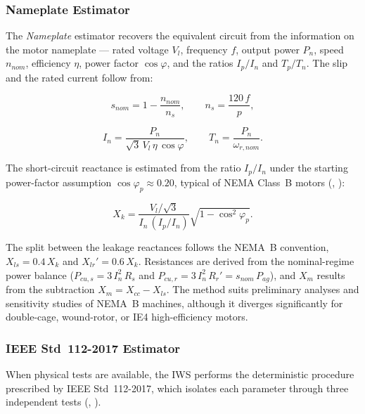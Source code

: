 \subsubsection{Nameplate Estimator}

The \textit{Nameplate} estimator recovers the equivalent circuit from the information on the motor nameplate — rated voltage $V_l$, frequency $f$, output power $P_n$, speed $n_{nom}$, efficiency $\eta$, power factor $\cos\varphi$, and the ratios $I_p/I_n$ and $T_p/T_n$. The slip and the rated current follow from:

\begin{equation}
\label{eq:nameplate_snom_en}
s_{nom} = 1 - \frac{n_{nom}}{n_s}, \qquad n_s = \frac{120\,f}{p},
\end{equation}

\begin{equation}
\label{eq:nameplate_in_en}
I_n = \frac{P_n}{\sqrt{3}\,V_l\,\eta\,\cos\varphi}, \qquad T_n = \frac{P_n}{\omega_{r,nom}}.
\end{equation}

The short-circuit reactance is estimated from the ratio $I_p/I_n$ under the starting power-factor assumption $\cos\varphi_p \approx 0.20$, typical of NEMA Class~B motors (\citeauthor{li2010simulation}, \citeyear{li2010simulation}):

\begin{equation}
\label{eq:nameplate_xk_en}
X_k = \frac{V_l/\sqrt{3}}{I_n\,(I_p/I_n)}\sqrt{1 - \cos^2\!\varphi_p}.
\end{equation}

The split between the leakage reactances follows the NEMA~B convention, $X_{ls} = 0.4\,X_k$ and $X_{lr}' = 0.6\,X_k$. Resistances are derived from the nominal-regime power balance ($P_{cu,s} = 3\,I_n^2\,R_s$ and $P_{cu,r} = 3\,I_n^2\,R_r' = s_{nom}\,P_{ag}$), and $X_m$ results from the subtraction $X_m = X_{cc} - X_{ls}$. The method suits preliminary analyses and sensitivity studies of NEMA~B machines, although it diverges significantly for double-cage, wound-rotor, or IE4 high-efficiency motors.

\subsubsection{IEEE Std~112-2017 Estimator}

When physical tests are available, the IWS performs the deterministic procedure prescribed by IEEE Std~112-2017, which isolates each parameter through three independent tests (\citeauthor{ieee112_2017}, \citeyear{ieee112_2017}).

